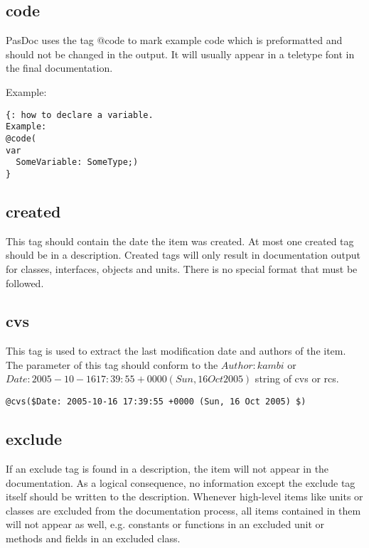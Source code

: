 \documentclass[11pt]{article}
\begin{document}
\subsection{code}

PasDoc uses the tag @code to mark example code which is preformatted and should 
not be changed in the output. It will usually appear in a teletype font in
the final documentation.

Example:
\begin{verbatim}
{: how to declare a variable.
Example:
@code(
var
  SomeVariable: SomeType;)
}
\end{verbatim}


\subsection{created}

This tag should contain the date the item was created.
At most one created tag should be in a description.
Created tags will only result in documentation output for
classes, interfaces, objects and units.
There is no special format that must be followed.

\subsection{cvs}

This tag is used to extract the last modification
date and authors of the item. The parameter of this
tag should conform to the $Author: kambi $ or $Date: 2005-10-16 17:39:55 +0000 (Sun, 16 Oct 2005) $ string
of cvs or rcs.

\begin{verbatim}
@cvs($Date: 2005-10-16 17:39:55 +0000 (Sun, 16 Oct 2005) $)
\end{verbatim}

\subsection{exclude}

If an exclude tag is found in a description, the item will not
appear in the documentation.
As a logical consequence, no information except the
exclude tag itself should be written to the description.
Whenever high-level items like units or classes are excluded from the
documentation process, all items contained in them will not appear as well,
e.g. constants or functions in an excluded unit or methods and fields in
an excluded class.
\end{document}
